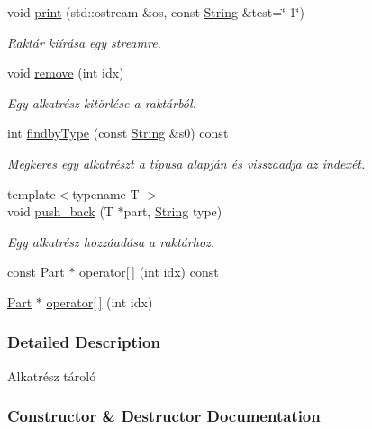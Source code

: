 \begin{DoxyCompactItemize}
void \mbox{\hyperlink{class_inventory_ae141405ba9deea67f5c1be1850d136fe}{print}} (std\+::ostream \&os, const \mbox{\hyperlink{class_string}{String}} \&test=\char`\"{}-\/1\char`\"{})
\begin{DoxyCompactList}\small\item\em Raktár kiírása egy streamre. \end{DoxyCompactList}\item 
void \mbox{\hyperlink{class_inventory_a1f602317e97625523444591ac5bf8bd7}{remove}} (int idx)
\begin{DoxyCompactList}\small\item\em Egy alkatrész kitörlése a raktárból. \end{DoxyCompactList}\item 
int \mbox{\hyperlink{class_inventory_a2a5998334229d148aac3e0dc16642480}{findby\+Type}} (const \mbox{\hyperlink{class_string}{String}} \&s0) const
\begin{DoxyCompactList}\small\item\em Megkeres egy alkatrészt a típusa alapján és visszaadja az indexét. \end{DoxyCompactList}\item 
{\footnotesize template$<$typename T $>$ }\\void \mbox{\hyperlink{class_inventory_a86dd14362d6cefb46d4e40667c44481c}{push\+\_\+back}} (T $\ast$part, \mbox{\hyperlink{class_string}{String}} type)
\begin{DoxyCompactList}\small\item\em Egy alkatrész hozzáadása a raktárhoz. \end{DoxyCompactList}\item 
const \mbox{\hyperlink{class_part}{Part}} $\ast$ \mbox{\hyperlink{class_inventory_a99b8be25beb3530c47d1faa913633979}{operator\mbox{[}$\,$\mbox{]}}} (int idx) const
\item 
\mbox{\hyperlink{class_part}{Part}} $\ast$ \mbox{\hyperlink{class_inventory_a86601b8ee999e78cdeea83431bab8f33}{operator\mbox{[}$\,$\mbox{]}}} (int idx)
\end{DoxyCompactItemize}


\subsubsection{Detailed Description}
Alkatrész tároló 

\subsubsection{Constructor \& Destructor Documentation}
\mbox{\label{class_inventory_af2c8bea3c8fbf97fec4d3f5ffb92f347}} 
